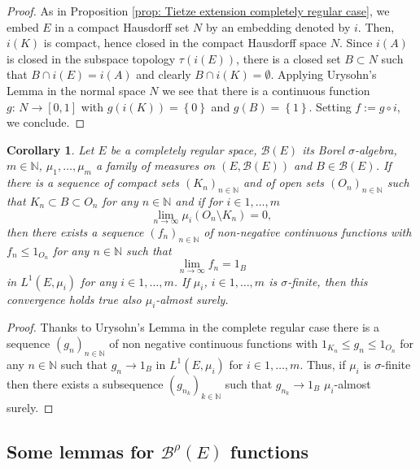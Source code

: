 \documentclass[a4paper,12pt]{article}
\newtheorem{corollary}[theorem]{Corollary}
\theoremstyle{definition}
\theoremstyle{remark}
\numberwithin{equation}{section}
\numberwithin{theorem}{section}
\begin{document}
\begin{proof}
As in Proposition \ref{prop: Tietze extension completely regular case},
we embed $E$ in a compact Hausdorff set $N$ by an embedding denoted by $i$. Then, 
$i(K)$ is compact, hence closed in the compact Hausdorff space $N$.
Since $i(A)$ is closed in the subspace topology $\tau(i(E))$, there
is a closed set $B\subset N$ such that $B\cap i(E)=i(A)$ and clearly
$B\cap i(K)=\emptyset.$ Applying Urysohn's Lemma in the normal space
$N$ we see that there is a continuous function $g:\,N\rightarrow\left[0,1\right]$
with $g(i(K))=\left\{ 0\right\} $ and $g(B)=\left\{ 1\right\} $.
Setting $f:=g\circ i$, we conclude. 
\end{proof}

\begin{corollary}
\label{cor:completely regular space, convergence of continuous bounded functions to open set}Let
$E$ be a completely regular space, $\mathcal{B}(E)$ its Borel $\sigma$-algebra, $m\in\mathbb{N}$, $\mu_1,\ldots,\mu_m$ a family of measures on $\left(E,\mathcal{B}(E)\right)$ and $B\in\mathcal{B}(E)$.
If there is a sequence of compact sets $\left(K_{n}\right)_{n\in\mathbb{N}}$
and of open sets $\left(O_{n}\right)_{n\in\mathbb{N}}$ such that $K_{n}\subset B\subset O_{n}$
for any $n\in\mathbb{N}$ and if for $i\in{1,\ldots,m}$
\[
\underset{n\rightarrow\infty}{\lim}\mu_i(O_{n}\setminus K_{n})=0,
\]
then there exists a sequence $\left(f_{n}\right)_{n\in\mathbb{N}}$
of non-negative continuous functions with $f_{n}\leq1_{O_{n}}$ for
any $n\in\mathbb{N}$ such that 
\[
\underset{n\rightarrow\infty}{\lim}f_{n}=1_{B}
\]
 in $L^{1}\left(E,\mu_i\right)$ for any $i\in{1,\ldots,m}$. If $\mu_i$, $i\in{1,\ldots,m}$ is $\sigma$-finite, then
this convergence holds true also $\mu_i$-almost surely.
\end{corollary}

\begin{proof}
Thanks to Urysohn's Lemma in the complete regular case there is a
sequence $\left(g_{n}\right)_{n\in\mathbb{N}}$ of non negative continuous
functions with $1_{K_{n}}\leq g_{n}\leq1_{O_{n}}$ for any $n\in\mathbb{N}$
such that $g_{n}\rightarrow1_{B}$ in $L^{1}\left(E,\mu_i\right)$ for $i\in{1,\ldots,m}$. Thus, if $\mu_i$ is $\sigma$-finite then there exists a subsequence $\left(g_{n_{k}}\right)_{k\in\mathbb{N}}$
such that $g_{n_{k}}\rightarrow1_{B}$ $\mu_i$-almost surely.
\end{proof}


\subsection{Some lemmas for $\mathscr{B}^{\rho}(E)$ functions }
\end{document}
